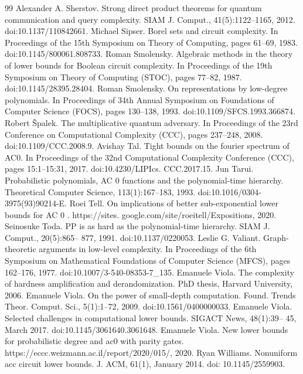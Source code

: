\begin{thebibliography}{99}
 Alexander A. Sherstov. Strong direct product theorems for quantum communication and query complexity. SIAM J. Comput., 41(5):1122–1165, 2012. doi:10.1137/110842661.
 Michael Sipser. Borel sets and circuit complexity. In Proceedings of the 15th Symposium on Theory of Computing, pages 61–69, 1983. doi:10.1145/800061.808733.
 Roman Smolensky. Algebraic methods in the theory of lower bounds for Boolean circuit complexity. In Proceedings of the 19th Symposium on Theory of Computing (STOC), pages 77–82, 1987. doi:10.1145/28395.28404.
 Roman Smolensky. On representations by low-degree polynomials. In Proceedings of 34th Annual Symposium on Foundations of Computer Science (FOCS), pages 130–138, 1993. doi:10.1109/SFCS.1993.366874.
 Robert Špalek. The multiplicative quantum adversary. In Proceedings of the 23rd Conference on Computational Complexity (CCC), pages 237–248, 2008. doi:10.1109/CCC.2008.9.
 Avishay Tal. Tight bounds on the fourier spectrum of AC0. In Proceedings of the 32nd Computational Complexity Conference (CCC), pages 15:1–15:31, 2017. doi:10.4230/LIPIcs. CCC.2017.15.
 Jun Tarui. Probabilistic polynomials, AC 0 functions and the polynomial-time hierarchy. Theoretical Computer Science, 113(1):167–183, 1993. doi:10.1016/0304-3975(93)90214-E.
 Roei Tell. On implications of better sub-exponential lower bounds for AC 0 . https://sites. google.com/site/roeitell/Expositions, 2020.
 Seinosuke Toda. PP is as hard as the polynomial-time hierarchy. SIAM J. Comput., 20(5):865– 877, 1991. doi:10.1137/0220053.
 Leslie G. Valiant. Graph-theoretic arguments in low-level complexity. In Proceedings of the 6th Symposium on Mathematical Foundations of Computer Science (MFCS), pages 162–176, 1977. doi:10.1007/3-540-08353-7\_135.
 Emanuele Viola. The complexity of hardness amplification and derandomization. PhD thesis, Harvard University, 2006.
 Emanuele Viola. On the power of small-depth computation. Found. Trends Theor. Comput. Sci., 5(1):1–72, 2009. doi:10.1561/0400000033.
 Emanuele Viola. Selected challenges in computational lower bounds. SIGACT News, 48(1):39– 45, March 2017. doi:10.1145/3061640.3061648.
 Emanuele Viola. New lower bounds for probabilistic degree and ac0 with parity gates. https://eccc.weizmann.ac.il/report/2020/015/, 2020.
 Ryan Williams. Nonuniform acc circuit lower bounds. J. ACM, 61(1), January 2014. doi: 10.1145/2559903.

\end{thebibliography}
